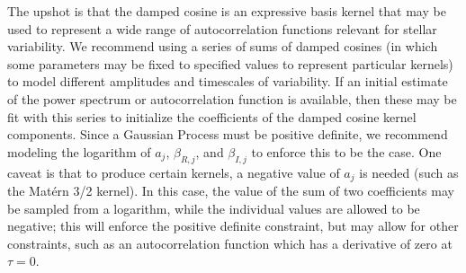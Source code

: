 \documentclass[manuscript, letterpaper]{aastex6}
\begin{document}
The upshot is that the damped cosine is an expressive basis kernel that may be used
to represent a wide range of autocorrelation functions relevant for stellar variability.
We recommend using a series of sums of damped cosines (in which some parameters may be
fixed to specified values to represent particular kernels) to model different amplitudes
and timescales of variability.  If an initial estimate of the power spectrum or
autocorrelation function is available, then these may be fit with this series to
initialize the coefficients of the damped cosine kernel components.
Since a Gaussian Process
must be positive definite, we recommend modeling the logarithm of $a_j$,
$\beta_{R,j}$, and $\beta_{I,j}$ to enforce this to be the case.  One caveat is
that to produce certain kernels, a negative value of $a_j$ is needed (such
as the Mat\'ern 3/2 kernel).  In this case, the value of the sum of
two coefficients may be sampled from a logarithm, while the individual
values are allowed to be negative;  this will enforce the positive definite
constraint, but may allow for other constraints, such as an autocorrelation
function which has a derivative of zero at $\tau = 0$.
\end{document}
